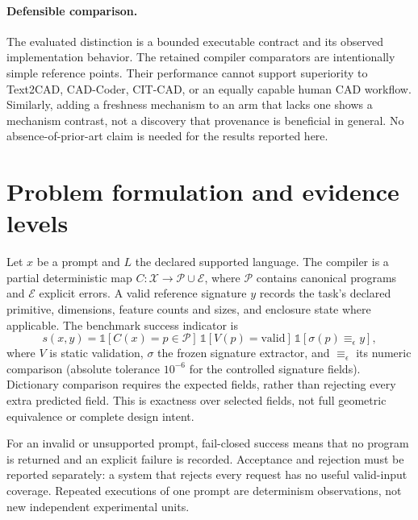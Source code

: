 \documentclass[10pt]{article}
\newcommand{\ind}{\mathbb{1}}
\begin{document}
\paragraph{Defensible comparison.}
The evaluated distinction is a bounded executable contract and its observed
implementation behavior. The retained compiler comparators are intentionally
simple reference points. Their performance cannot support superiority to
Text2CAD, CAD-Coder, CIT-CAD, or an equally capable human CAD workflow.
Similarly, adding a freshness mechanism to an arm that lacks one shows a
mechanism contrast, not a discovery that provenance is beneficial in general.
No absence-of-prior-art claim is needed for the results reported here.

\section{Problem formulation and evidence levels}

Let \(x\) be a prompt and \(L\) the declared supported language. The compiler is
a partial deterministic map \(C:\mathcal X\to\mathcal P\cup\mathcal E\), where
\(\mathcal P\) contains canonical programs and \(\mathcal E\) explicit errors.
A valid reference signature \(y\) records the task's declared primitive,
dimensions, feature counts and sizes, and enclosure state where applicable.
The benchmark success indicator is
\begin{equation}
 s(x,y)=\ind[C(x)=p\in\mathcal P]\,
        \ind[V(p)=\mathrm{valid}]\,
        \ind[\sigma(p)\equiv_\epsilon y],
\end{equation}
where \(V\) is static validation, \(\sigma\) the frozen signature extractor,
and \(\equiv_\epsilon\) its numeric comparison (absolute tolerance
\(10^{-6}\) for the controlled signature fields). Dictionary comparison
requires the expected fields, rather than rejecting every extra predicted
field. This is exactness
over selected fields, not full geometric equivalence or complete design intent.

For an invalid or unsupported prompt, fail-closed success means that no
program is returned and an explicit failure is recorded. Acceptance and
rejection must be reported separately: a system that rejects every request
has no useful valid-input coverage. Repeated executions of one prompt are
determinism observations, not new independent experimental units.
\end{document}
